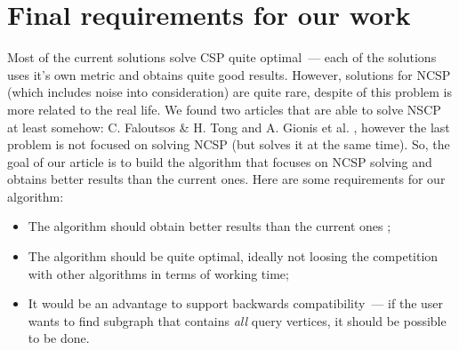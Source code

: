 \section{Final requirements for our work}

Most of the current solutions solve CSP quite optimal~--- each of the solutions uses it's own metric and obtains quite good results. However, solutions for NCSP (which includes noise into consideration) are quite rare, despite of this problem is more related to the real life. We found two articles that are able to solve NSCP at least somehow: C. Faloutsos \& H. Tong \cite{Faloutsos06} and A. Gionis et al. \cite{Gionis15}, however the last problem is not focused on solving NCSP (but solves it at the same time). So, the goal of our article is to build the algorithm that focuses on NCSP solving and obtains better results than the current ones. Here are some requirements for our algorithm:

\begin{itemize}
    \item The algorithm should obtain better results than the current ones \cite{Faloutsos06, Gionis15, Barbieri15};
    \item The algorithm should be quite optimal, ideally not loosing the competition with other algorithms in terms of working time;
    \item It would be an advantage to support backwards compatibility~--- if the user wants to find subgraph that contains \textit{all} query vertices, it should be possible to be done.
\end{itemize}

